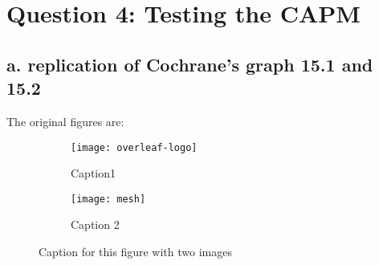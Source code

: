 \documentclass[]{article}
\title{}
\author{}
\begin{document}
	
	\maketitle
	
	
	\section*{Question 4: Testing the CAPM}
	\subsection*{a. replication of Cochrane's graph 15.1 and 15.2}
	
	The original figures are:
	
\begin{figure}[h]
	
	\begin{subfigure}{0.5\textwidth}
		\texttt{[image: overleaf-logo]} 
		\caption{Caption1}
		\label{fig:subim1}
	\end{subfigure}
	\begin{subfigure}{0.5\textwidth}
		\texttt{[image: mesh]}
		\caption{Caption 2}
		\label{fig:subim2}
	\end{subfigure}
	
	\caption{Caption for this figure with two images}
	\label{fig:image2}
\end{figure}
	
	
	
\end{document}
